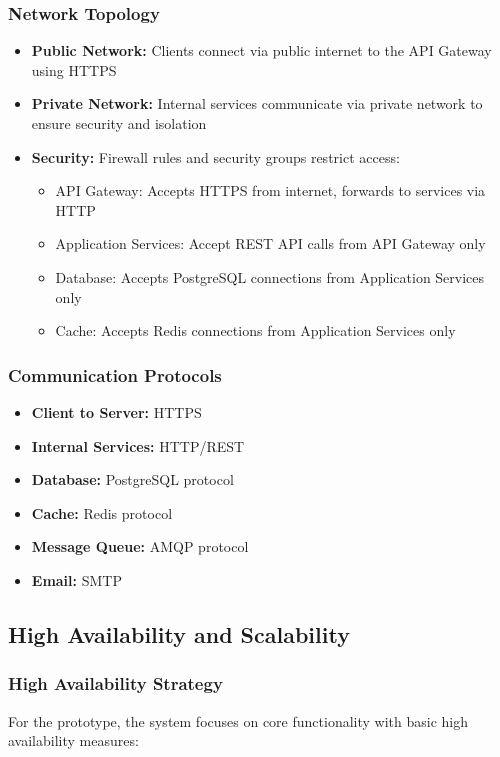 \subsubsection{Network Topology}
\begin{itemize}
    \item \textbf{Public Network:} Clients connect via public internet to the API Gateway using HTTPS
    \item \textbf{Private Network:} Internal services communicate via private network to ensure security and isolation
    \item \textbf{Security:} Firewall rules and security groups restrict access:
    \begin{itemize}
        \item API Gateway: Accepts HTTPS from internet, forwards to services via HTTP
        \item Application Services: Accept REST API calls from API Gateway only
        \item Database: Accepts PostgreSQL connections from Application Services only
        \item Cache: Accepts Redis connections from Application Services only
    \end{itemize}
\end{itemize}

\subsubsection{Communication Protocols}
\begin{itemize}
    \item \textbf{Client to Server:} HTTPS
    \item \textbf{Internal Services:} HTTP/REST
    \item \textbf{Database:} PostgreSQL protocol
    \item \textbf{Cache:} Redis protocol
    \item \textbf{Message Queue:} AMQP protocol
    \item \textbf{Email:} SMTP
\end{itemize}

\subsection{High Availability and Scalability}

\subsubsection{High Availability Strategy}
For the prototype, the system focuses on core functionality with basic high availability measures:

